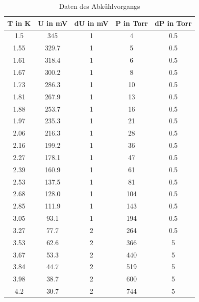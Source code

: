 \documentclass[bigchapter,colorback,accentcolor=tud4b,linedtoc,11pt]{tudreport}
\begin{document}
 \begin{center}
 \begin{table}[H]
 \caption{Daten des Abkühlvorgangs}
  \begin{center}
  \begin{tabular}{|c|c|c|c|c|}
    T in K & 	U in mV &  dU in mV &  P in Torr  &  dP in Torr \\ \hline
1.5	&      345	&        1  &           4  &          0.5 \\ \hline
1.55	&   329.7  	&    1      &       5       &     0.5 \\ \hline
1.61	&    318.4  	&    1      &       6       &     0.5 \\ \hline
1.67	&    300.2  	&    1      &       8      &      0.5 \\ \hline
1.73	&    286.3  	&    1      &       10     &      0.5 \\ \hline
1.81	&    267.9  	&    1      &       13     &      0.5 \\ \hline
1.88	&    253.7  	&    1      &       16     &      0.5 \\ \hline
1.97	&    235.3  	&    1      &       21     &      0.5 \\ \hline
2.06	&    216.3  	&    1      &       28     &      0.5 \\ \hline
2.16	&    199.2  	&    1      &       36     &      0.5 \\ \hline
2.27	&    178.1  	&    1      &       47     &      0.5 \\ \hline
2.39	&    160.9  	&    1      &       61     &      0.5 \\ \hline
2.53	&    137.5  	&    1      &      81      &     0.5 \\ \hline
2.68	&    128.0      &    1      &       104    &      0.5 \\ \hline
2.85	&    111.9	&      1    &         143  &        0.5 \\ \hline
3.05	&    93.1	&      1    &         194  &        0.5 \\ \hline
3.27	&    77.7	&      2     &        264  &        0.5 \\ \hline
3.53	&    62.6	&      2     &        366  &        5 \\ \hline
3.67	&    53.3	&      2     &        440  &        5 \\ \hline
3.84    &    44.7	&      2     &        519  &        5 \\ \hline
3.98	&    38.7	&      2     &        600  &        5 \\ \hline
4.2	&      30.7	&      2     &        744  &        5 \\ \hline
    \end{tabular}
    \end{center}
 \label{tab:abkühl}
 \end{table}  
\end{center}
   
\end{document}
